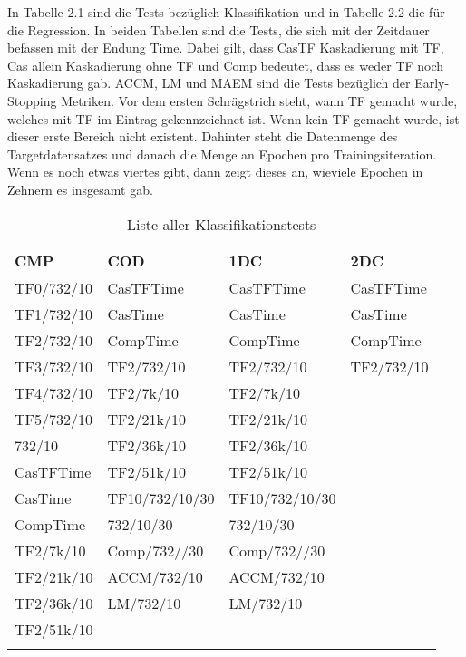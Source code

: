 In Tabelle 2.1 sind die Tests bezüglich Klassifikation und in Tabelle 2.2 die für die Regression. 
In beiden Tabellen sind die Tests, die sich mit der Zeitdauer befassen mit der Endung Time. Dabei gilt, dass CasTF Kaskadierung mit TF, Cas allein 
Kaskadierung ohne TF und Comp bedeutet, dass es weder TF noch Kaskadierung gab. ACCM, LM und MAEM sind die Tests bezüglich der Early-Stopping 
Metriken. 
Vor dem ersten Schrägstrich steht, wann TF gemacht wurde, welches mit TF im Eintrag gekennzeichnet ist. Wenn kein TF gemacht wurde, ist dieser 
erste Bereich nicht existent. Dahinter steht die Datenmenge 
des Targetdatensatzes und danach die Menge an Epochen pro Trainingsiteration. Wenn es noch etwas viertes gibt, dann zeigt dieses an, wieviele 
Epochen in Zehnern es insgesamt gab. 

\begin{table}[!ht]
    \centering
    \begin{tabular}{l|l|l|l}
        \textbf{CMP} & \textbf{COD} & \textbf{1DC} & \textbf{2DC} \\
        \hline
        TF0/732/10 & CasTFTime & CasTFTime & CasTFTime \\
        TF1/732/10 & CasTime & CasTime & CasTime \\
        TF2/732/10 & CompTime & CompTime & CompTime \\
        TF3/732/10 & TF2/732/10 & TF2/732/10 & TF2/732/10 \\
        TF4/732/10 & TF2/7k/10 & TF2/7k/10 & \\
        TF5/732/10 & TF2/21k/10 & TF2/21k/10 & \\
        732/10 & TF2/36k/10 & TF2/36k/10 & \\
        CasTFTime & TF2/51k/10 & TF2/51k/10 & \\
        CasTime & TF10/732/10/30 & TF10/732/10/30 & \\
        CompTime & 732/10/30 & 732/10/30 & \\
        TF2/7k/10 & Comp/732//30 & Comp/732//30 & \\
        TF2/21k/10 & ACCM/732/10 & ACCM/732/10 & \\
        TF2/36k/10 & LM/732/10 & LM/732/10 & \\
        TF2/51k/10 & & & \\
        & & & \\
    \end{tabular}
    \caption{\label{tab:classtests} Liste aller Klassifikationstests}
\end{table}

